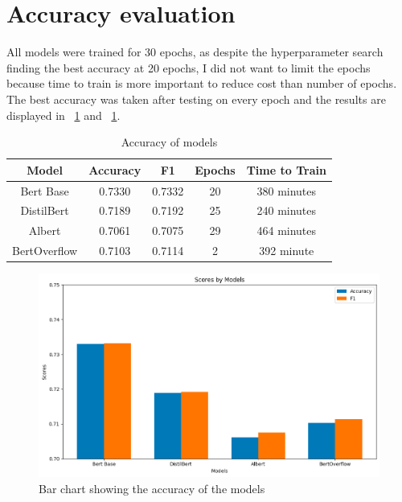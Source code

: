 \documentclass{UoYCSproject}
\begin{document}
    \section{Accuracy evaluation}\label{sec:accuracy-evaluation}
    All models were trained for 30 epochs, as despite the hyperparameter search finding the best accuracy at 20 epochs, I did not want to limit the epochs because time to train is more important to reduce cost than number of epochs. The best accuracy was taken after testing on every epoch and the results are displayed in ~\ref{tab:accuracy} and ~\ref{fig:accuracy}. \par



\begin{table}[h]
\centering
\begin{tabular}{ccccc}
\toprule
Model        & Accuracy & F1     & Epochs  & Time to Train\\
\midrule
Bert Base    & 0.7330   & 0.7332 & 20 & 380 minutes     \\\addlinespace[0.5em]
DistilBert   & 0.7189   & 0.7192 & 25 & 240 minutes     \\\addlinespace[0.5em]
Albert       & 0.7061   & 0.7075 & 29 & 464 minutes    \\\addlinespace[0.5em]
BertOverflow & 0.7103   & 0.7114 & 2 & 392 minute      \\
\bottomrule
\end{tabular}

\caption{Accuracy of models} \label{tab:accuracy}
\end{table}

\begin{figure}[h]
    \centering

        \includegraphics[width=12cm]{./figures/model-accuracy}
        \caption{Bar chart showing the accuracy of the models}
        \label{fig:accuracy}
    \end{figure}
\end{document}

